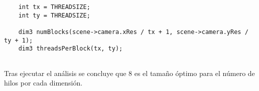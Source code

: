 \begin{lstlisting}
    int tx = THREADSIZE;
    int ty = THREADSIZE;

    dim3 numBlocks(scene->camera.xRes / tx + 1, scene->camera.yRes / ty + 1);
    dim3 threadsPerBlock(tx, ty);
	
\end{lstlisting}


\begin{figure}[H]
\label{fig:threadsize}
\centering
{}
\end{figure}

Tras ejecutar el análisis se concluye que 8 es el tamaño óptimo para el número de hilos por cada dimensión.
